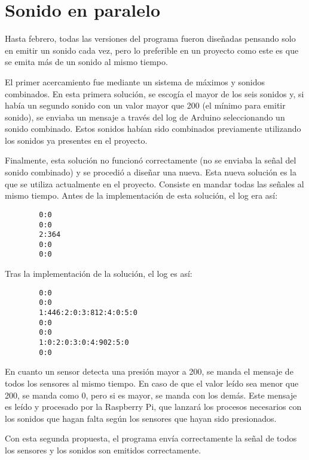 
    \section{Sonido en paralelo} %
    \label{sec:SonidoEnParalelo}

        Hasta febrero, todas las versiones del programa fueron diseñadas pensando solo en emitir un sonido cada vez,
        pero lo preferible en un proyecto como este es que se emita más de un sonido al mismo tiempo.

        El primer acercamiento fue mediante un sistema de máximos y sonidos combinados. En esta primera solución, se
        escogía el mayor de los seis sonidos y, si había un segundo sonido con un valor mayor que 200 (el mínimo para
        emitir sonido), se enviaba un mensaje a través del log de Arduino seleccionando un sonido combinado. Estos
        sonidos habían sido combinados previamente utilizando los sonidos ya presentes en el proyecto.

        Finalmente, esta solución no funcionó correctamente (no se enviaba la señal del sonido combinado) y se procedió
        a diseñar una nueva. Esta nueva solución es la que se utiliza actualmente en el proyecto. Consiste en mandar
        todas las señales al mismo tiempo. Antes de la implementación de esta solución, el log era así:

        \begin{verbatim}
        0:0
        0:0
        2:364
        0:0
        0:0
        \end{verbatim}

        Tras la implementación de la solución, el log es así:

        \begin{verbatim}
        0:0
        0:0
        1:446:2:0:3:812:4:0:5:0
        0:0
        0:0
        1:0:2:0:3:0:4:902:5:0
        0:0
        \end{verbatim}

        En cuanto un sensor detecta una presión mayor a 200, se manda el mensaje de todos los sensores al mismo tiempo.
        En caso de que el valor leído sea menor que 200, se manda como 0, pero si es mayor, se manda con los demás. Este
        mensaje es leído y procesado por la Raspberry Pi, que lanzará los procesos necesarios con los sonidos que hagan
        falta según los sensores que hayan sido presionados.

        Con esta segunda propuesta, el programa envía correctamente la señal de todos los sensores y los sonidos son
        emitidos correctamente.

